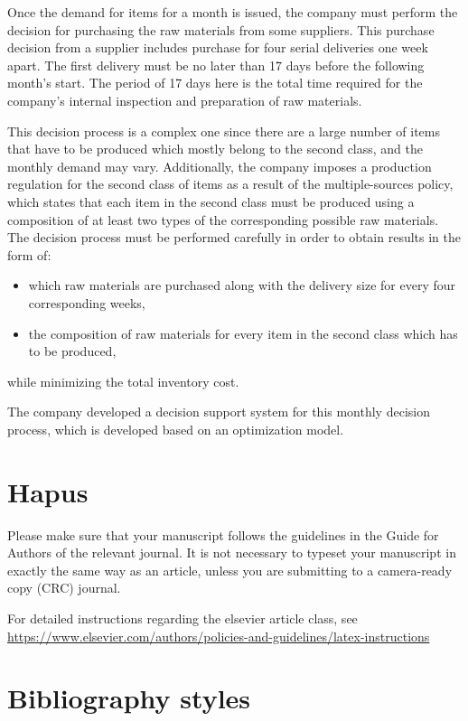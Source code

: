 \documentclass[preprint, 3p,
authoryear]{elsarticle} %
\providecommand{\tightlist}{%
  \setlength{\itemsep}{0pt}\setlength{\parskip}{0pt}}
\begin{document}
Once the demand for items for a month is issued, the company must
perform the decision for purchasing the raw materials from some
suppliers. This purchase decision from a supplier includes purchase for
four serial deliveries one week apart. The first delivery must be no
later than 17 days before the following month's start. The period of 17
days here is the total time required for the company's internal
inspection and preparation of raw materials.

This decision process is a complex one since there are a large number of
items that have to be produced which mostly belong to the second class,
and the monthly demand may vary. Additionally, the company imposes a
production regulation for the second class of items as a result of the
multiple-sources policy, which states that each item in the second class
must be produced using a composition of at least two types of the
corresponding possible raw materials. The decision process must be
performed carefully in order to obtain results in the form of:

\begin{itemize}
\tightlist
\item
  which raw materials are purchased along with the delivery size for
  every four corresponding weeks,
\item
  the composition of raw materials for every item in the second class
  which has to be produced,
\end{itemize}

while minimizing the total inventory cost.

The company developed a decision support system for this monthly
decision process, which is developed based on an optimization model.

\newpage

\hypertarget{hapus}{%
\section{Hapus}\label{hapus}}

Please make sure that your manuscript follows the guidelines in the
Guide for Authors of the relevant journal. It is not necessary to
typeset your manuscript in exactly the same way as an article, unless
you are submitting to a camera-ready copy (CRC) journal.

For detailed instructions regarding the elsevier article class, see
\url{https://www.elsevier.com/authors/policies-and-guidelines/latex-instructions}

\hypertarget{bibliography-styles}{%
\section{Bibliography styles}\label{bibliography-styles}}
\end{document}
